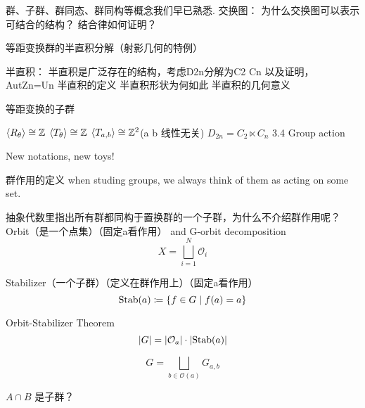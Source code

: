 群、子群、群同态、群同构等概念我们早已熟悉.
交换图： 为什么交换图可以表示可结合的结构？
结合律如何证明？

等距变换群的半直积分解（射影几何的特例）

半直积：
半直积是广泛存在的结构，考虑D2n分解为C2 Cn 以及证明，AutZn=Un
半直积的定义
半直积形状为何如此
半直积的几何意义

等距变换的子群

\(\langle R_{\theta} \rangle\cong \mathbb{Z}\)
\(\langle T_{\theta} \rangle\cong \mathbb{Z}\)
\(\langle T_{a,b} \rangle\cong \mathbb{Z}^{2}\)(a b 线性无关)
\(D_{2n}=C_{2}\ltimes C_{n}\)
3.4 Group action

New notations, new toys!

群作用的定义
when studing groups, we always think of them as acting on some set.

抽象代数里指出所有群都同构于置换群的一个子群，为什么不介绍群作用呢？
Orbit（是一个点集）（固定a看作用） and G-orbit decomposition
\[
    X=\bigsqcup_{i=1}^{N} \mathcal{O}_{i}
\]

Stabilizer（一个子群）（定义在群作用上）（固定a看作用）
\[
    \operatorname{\mathrm{Stab}}(a)\coloneq \left\{ f \in G \mid f(a)=a \right\}
\]

Orbit-Stabilizer Theorem
\[
    \left| G \right| = \left| \mathcal{O}_{a} \right| \cdot
    \left| \operatorname{\mathrm{Stab}}(a) \right|
\]

\[
    G= \bigsqcup_{b\in \mathcal{O}(a)} G_{a,b}
\]

\(A\cap B\) 是子群？

